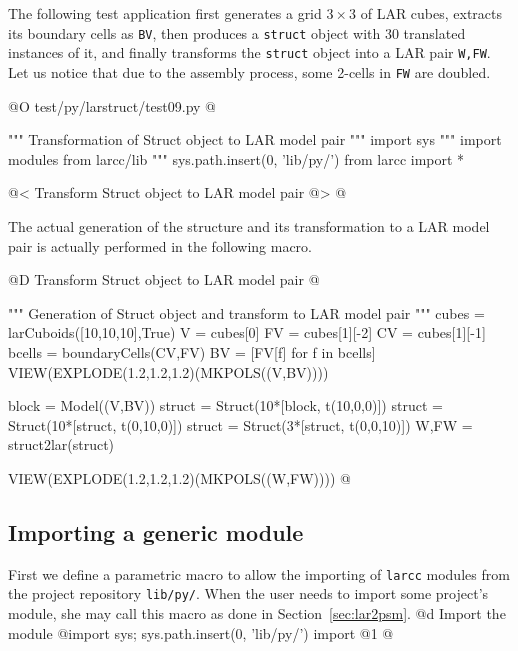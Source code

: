 \documentclass[11pt,oneside]{article}    %
\begin{document}
The following test application first generates a grid $3\times 3$ of LAR cubes, extracts
its boundary cells as \texttt{BV}, then produces a \texttt{struct} object with 30 translated instances of it,
and finally transforms the \texttt{struct} object into a LAR pair \texttt{W,FW}.
Let us notice that due to the assembly process, some 2-cells in \texttt{FW} are doubled.

@O test/py/larstruct/test09.py
@{""" Transformation of Struct object to LAR model pair """
import sys
""" import modules from larcc/lib """
sys.path.insert(0, 'lib/py/')
from larcc import *

@< Transform Struct object to LAR model pair @>
@}

The actual generation of the structure and its transformation to a LAR model pair is actually performed in the following macro.

@D Transform Struct object to LAR model pair
@{""" Generation of Struct object and transform to LAR model pair """
cubes = larCuboids([10,10,10],True)
V = cubes[0]
FV = cubes[1][-2]
CV = cubes[1][-1]
bcells = boundaryCells(CV,FV)
BV = [FV[f] for f in bcells]
VIEW(EXPLODE(1.2,1.2,1.2)(MKPOLS((V,BV))))

block = Model((V,BV))
struct = Struct(10*[block, t(10,0,0)])
struct = Struct(10*[struct, t(0,10,0)])
struct = Struct(3*[struct, t(0,0,10)])
W,FW = struct2lar(struct)

VIEW(EXPLODE(1.2,1.2,1.2)(MKPOLS((W,FW))))
@}



\appendix
\subsection{Importing a generic module}
First we define a parametric macro to allow the importing of \texttt{larcc} modules from the project repository \texttt{lib/py/}. When the user needs to import some project's module, she may call this macro as done in Section~\ref{sec:lar2psm}.
@d Import the module
@{import sys; sys.path.insert(0, 'lib/py/')
import @1
@}
\end{document}

